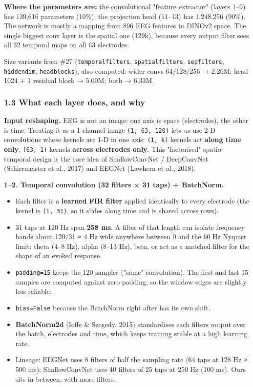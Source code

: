 \documentclass[
  11pt,
]{article}
\providecommand{\tightlist}{%
  \setlength{\itemsep}{0pt}\setlength{\parskip}{0pt}}
\renewcommand{\_}{\oldunderscore\allowbreak}
\begin{document}
\textbf{Where the parameters are:} the
convolutional "feature extractor"
(layers 1--9) has 139,616 parameters
(10\%); the projection head (11--13) has
1,248,256 (90\%). The network is mostly
a mapping from 896 EEG features to
DINOv2 space. The single biggest conv
layer is the spatial one (129k), because
every output filter sees all 32 temporal
maps on all 63 electrodes.

Size variants from \#27
(\texttt{temporal\_filters},
\texttt{spatial\_filters},
\texttt{sep\_filters},
\texttt{hidden\_dim},
\texttt{head\_blocks}), also computed:
wider convs 64/128/256 → 2.26M; head
1024 + 1 residual block → 5.00M; both →
6.33M.

\subsubsection{1.3 What each layer does,
and
why}\label{what-each-layer-does-and-why}

\textbf{Input reshaping.} EEG is not an
image: one axis is space (electrodes),
the other is time. Treating it as a
1-channel image \texttt{(1,\ 63,\ 120)}
lets us use 2-D convolutions whose
kernels are 1-D in one axis:
\texttt{(1,\ k)} kernels act
\textbf{along time only},
\texttt{(63,\ 1)} kernels \textbf{across
electrodes only}. This "factorised"
spatio-temporal design is the core idea
of ShallowConvNet / DeepConvNet
(Schirrmeister et al., 2017) and EEGNet
(Lawhern et al., 2018).

\textbf{1--2. Temporal convolution (32
filters × 31 taps) + BatchNorm.}

\begin{itemize}
\tightlist
\item
  Each filter is a \textbf{learned FIR
  filter} applied identically to every
  electrode (the kernel is
  \texttt{(1,\ 31)}, so it slides along
  time and is shared across rows).
\item
  31 taps at 120 Hz span \textbf{258
  ms}. A filter of that length can
  isolate frequency bands about 120/31 ≈
  4 Hz wide anywhere between 0 and the
  60 Hz Nyquist limit: theta (4--8 Hz),
  alpha (8--13 Hz), beta, or act as a
  matched filter for the shape of an
  evoked response.
\item
  \texttt{padding=15} keeps the 120
  samples ("same" convolution). The
  first and last 15 samples are computed
  against zero padding, so the window
  edges are slightly less reliable.
\item
  \texttt{bias=False} because the
  BatchNorm right after has its own
  shift.
\item
  \textbf{BatchNorm2d} (Ioffe \&
  Szegedy, 2015) standardises each
  filter\textquotesingle s output over
  the batch, electrodes and time, which
  keeps training stable at a high
  learning rate.
\item
  Lineage: EEGNet uses 8 filters of half
  the sampling rate (64 taps at 128 Hz ≈
  500 ms); ShallowConvNet uses 40
  filters of 25 taps at 250 Hz (100 ms).
  Ours sits in between, with more
  filters.
\end{itemize}
\end{document}
